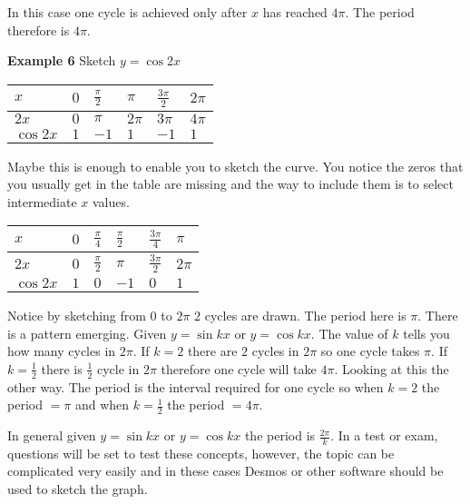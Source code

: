 In this case one cycle is achieved only after $x$ has reached $4 \pi $. The period therefore is $4 \pi $. 
\setlength\fboxrule{0.01in}\setlength\fboxsep{0.2in}

\textbf{Example 6} Sketch $y =\cos  2 x$ 

\begin{tabular}[c]{|l|l|l|l|l|l|}\hline
	$x$  & $0$  & $\frac{\pi }{2}$  & $\pi $  & $\frac{3 \pi }{2}$  & $2 \pi $  \\
	\hline
	$2 x$  & $0$  & $\pi $  & $2 \pi $  & $3 \pi $  & $4 \pi $  \\
	\hline
	$\cos  2 x$  & $1$  & $ -1$  & $1$  & $ -1$  & $1$  \\
	\hline
\end{tabular}

Maybe this is enough to enable you to sketch the curve. You notice the zeros that you usually get
in the table are missing and the way to include them is to select intermediate $x$ values. 

\begin{tabular}[c]{|l|l|l|l|l|l|}\hline
	$x$  & $0$  & $\frac{\pi }{4}$  & $\frac{\pi }{2}$  & $\frac{3 \pi }{4}$  & $\pi $  \\
	\hline
	$2 x$  & $0$  & $\frac{\pi }{2}$  & $\pi $  & $\frac{3 \pi }{2}$  & $2 \pi $  \\
	\hline
	$\cos  2 x$  & $1$  & $0$  & $ -1$  & $0$  & $1$  \\
	\hline
\end{tabular}
\setlength\fboxrule{0.01in}\setlength\fboxsep{0.2in}

Notice by sketching from $0$ to $2 \pi $ $2$ cycles are drawn. The period here is $\pi $. There is a pattern emerging. Given $y =\sin  k x$ or $y =\cos  k x$. The value of $k$ tells you how many cycles in $2 \pi $. If $k =2$ there are $2$ cycles in $2 \pi $ so one cycle takes $\pi $. If $k =\frac{1}{2}$ there is $\frac{1}{2}$ cycle in $2 \pi $ therefore one cycle will take $4 \pi $. Looking at this the other way. The period is the interval required for one cycle so when $k =2$ the period $ =\pi $ and when $k =\frac{1}{2}$ the period $ =4 \pi \text{.}$ 

In general given $y =\sin  k x$ or $y =\cos  k x$ the period is $\frac{2 \pi }{k}$. In a test or exam, questions will be set to test these concepts, however, the topic can be complicated very easily and in these cases Desmos or other software should be used to sketch the graph. 

